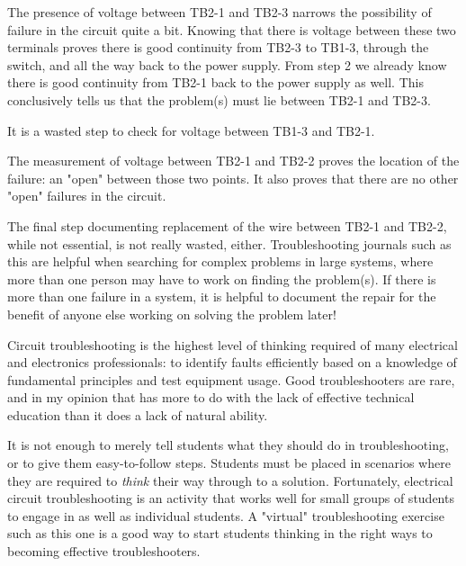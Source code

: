 The presence of voltage between TB2-1 and TB2-3 narrows the possibility of failure in the circuit quite a bit.  Knowing that there is voltage between these two terminals proves there is good continuity from TB2-3 to TB1-3, through the switch, and all the way back to the power supply.  From step 2 we already know there is good continuity from TB2-1 back to the power supply as well.  This conclusively tells us that the problem(s) must lie between TB2-1 and TB2-3.

It is a wasted step to check for voltage between TB1-3 and TB2-1.

The measurement of voltage between TB2-1 and TB2-2 proves the location of the failure: an "open" between those two points.  It also proves that there are no other "open" failures in the circuit.

The final step documenting replacement of the wire between TB2-1 and TB2-2, while not essential, is not really wasted, either.  Troubleshooting journals such as this are helpful when searching for complex problems in large systems, where more than one person may have to work on finding the problem(s).  If there is more than one failure in a system, it is helpful to document the repair for the benefit of anyone else working on solving the problem later!







Circuit troubleshooting is the highest level of thinking required of many electrical and electronics professionals: to identify faults efficiently based on a knowledge of fundamental principles and test equipment usage.  Good troubleshooters are rare, and in my opinion that has more to do with the lack of effective technical education than it does a lack of natural ability. 

It is not enough to merely tell students what they should do in troubleshooting, or to give them easy-to-follow steps.  Students must be placed in scenarios where they are required to {\it think} their way through to a solution.  Fortunately, electrical circuit troubleshooting is an activity that works well for small groups of students to engage in as well as individual students.  A "virtual" troubleshooting exercise such as this one is a good way to start students thinking in the right ways to becoming effective troubleshooters.




